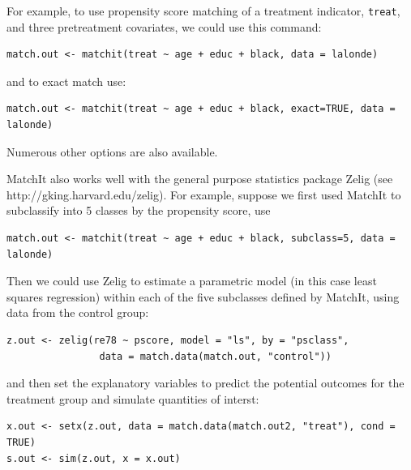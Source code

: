 \documentclass[11pt,titlepage]{article}
\begin{document}
For example, to use propensity score matching of a treatment
indicator, \texttt{treat}, and three pretreatment covariates, we could
use this command:
\begin{verbatim}
match.out <- matchit(treat ~ age + educ + black, data = lalonde)
\end{verbatim}
and to exact match use:
\begin{verbatim}
match.out <- matchit(treat ~ age + educ + black, exact=TRUE, data = lalonde)
\end{verbatim}
Numerous other options are also available.

MatchIt also works well with the general purpose statistics package
Zelig (see http://gking.harvard.edu/zelig).  For example, suppose we
first used MatchIt to subclassify into 5 classes by the propensity
score, use
\begin{verbatim}
match.out <- matchit(treat ~ age + educ + black, subclass=5, data = lalonde)
\end{verbatim}
Then we could use Zelig to estimate a parametric model (in this case
least squares regression) within each of the five subclasses defined
by MatchIt, using data from the control group:
\begin{verbatim}
z.out <- zelig(re78 ~ pscore, model = "ls", by = "psclass", 
                data = match.data(match.out, "control"))
\end{verbatim}
and then set the explanatory variables to predict the potential
outcomes for the treatment group and simulate quantities of interst:
\begin{verbatim}
x.out <- setx(z.out, data = match.data(match.out2, "treat"), cond = TRUE)
s.out <- sim(z.out, x = x.out)
\end{verbatim}


\baselineskip
 

\end{document}
